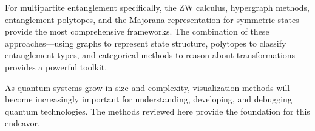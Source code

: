 \documentclass[%
 amsmath,amssymb,
 aps,
rmp,
]{revtex4-2}
\begin{document}
For multipartite entanglement specifically, the ZW calculus, hypergraph methods, entanglement polytopes, and the Majorana representation for symmetric states provide the most comprehensive frameworks. The combination of these approaches---using graphs to represent state structure, polytopes to classify entanglement types, and categorical methods to reason about transformations---provides a powerful toolkit.

As quantum systems grow in size and complexity, visualization methods will become increasingly important for understanding, developing, and debugging quantum technologies. The methods reviewed here provide the foundation for this endeavor.



\nocite{*}

\end{document}
